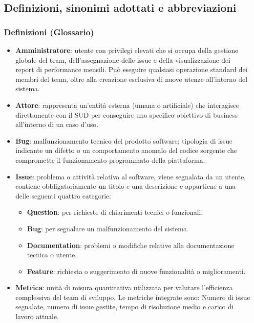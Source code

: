 \documentclass[a4paper,12pt]{article}
\begin{document}
\subsection{Definizioni, sinonimi adottati e abbreviazioni}
\subsubsection{Definizioni (Glossario)}
\begin{itemize}
    \item \textbf{Amministratore}: utente con privilegi elevati che si occupa della gestione globale del team, dell'assegnazione delle issue e della visualizzazione dei report di performance mensili. Può eseguire qualsiasi operazione standard dei membri del team, oltre alla creazione esclusiva di nuove utenze all'interno del sistema.
    
    \item \textbf{Attore}: rappresenta un'entità esterna (umana o artificiale) che interagisce direttamente con il SUD per conseguire uno specifico obiettivo di business all'interno di un caso d'uso.

    \item \textbf{Bug}: malfunzionamento tecnico del prodotto software; tipologia di issue indicante un difetto o un comportamento anomalo del codice sorgente che compromette il funzionamento programmato della piattaforma.

    \item \textbf{Issue}: problema o attività relativa al software, viene segnalata da un utente, contiene obbligatoriamente un titolo e una descrizione e appartiene a una delle seguenti quattro categorie:
    \begin{itemize}
        \item \textbf{Question}: per richieste di chiarimenti tecnici o funzionali.
        \item \textbf{Bug}: per segnalare un malfunzionamento del sistema.
        \item \textbf{Documentation}: problemi o modifiche relative alla documentazione tecnica o utente.
        \item \textbf{Feature}: richiesta o suggerimento di nuove funzionalità o miglioramenti.
    \end{itemize}

    \item \textbf{Metrica}: unità di misura quantitativa utilizzata per valutare l'efficienza complessiva del team di sviluppo. Le metriche integrate sono: Numero di issue segnalate, numero di issue gestite, tempo di risoluzione medio e carico di lavoro attuale.


\end{itemize}
\end{document}
